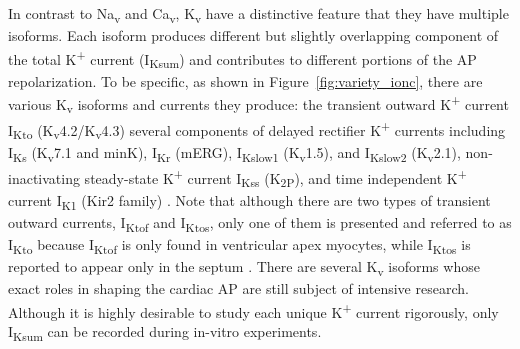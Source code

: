 \documentclass[utf8]{frontiersHLTH} %
\begin{document}
In contrast to Na\textsubscript{v} and Ca\textsubscript{v}, K\textsubscript{v} have a distinctive feature that they have multiple isoforms. Each isoform produces different but slightly overlapping component of the total K\textsuperscript{+} current (I\textsubscript{Ksum}) and contributes to different portions of the AP repolarization. To be specific, as shown in Figure~\ref{fig:variety_ionc}, there are various K\textsubscript{v} isoforms and currents they produce: the transient outward K\textsuperscript{+} current I\textsubscript{Kto} (K\textsubscript{v}4.2/K\textsubscript{v}4.3) several components of delayed rectifier K\textsuperscript{+} currents including I\textsubscript{Ks} (K\textsubscript{v}7.1 and minK), I\textsubscript{Kr} (mERG), I\textsubscript{Kslow1} (K\textsubscript{v}1.5), and I\textsubscript{Kslow2} (K\textsubscript{v}2.1), non-inactivating steady-state K\textsuperscript{+} current I\textsubscript{Kss} (K\textsubscript{2P}), and time independent K\textsuperscript{+} current I\textsubscript{K1} (Kir2 family) \cite{brouillette2004functional, liu2011dissection}. Note that although there are two types of transient outward currents, I\textsubscript{Ktof} and I\textsubscript{Ktos}, only one of them is presented and referred to as I\textsubscript{Kto} because I\textsubscript{Ktof} is only found in ventricular apex myocytes, while I\textsubscript{Ktos} is reported to appear only in the septum \cite{xu1999four}. There are several K\textsubscript{v} isoforms whose exact roles in shaping the cardiac AP are still subject of intensive research. Although it is highly desirable to study each unique K\textsuperscript{+} current rigorously, only I\textsubscript{Ksum} can be recorded during in-vitro experiments.
\end{document}
